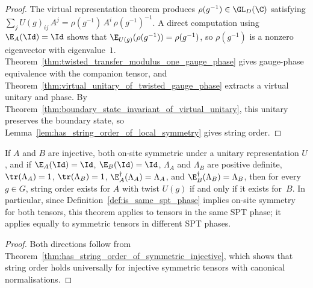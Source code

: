 \begin{proof}\leanok
    The virtual representation theorem produces
    $\rho(g^{-1}) \in \GL_{D}(\C)$ satisfying
    $\sum_j U(g)_{ij}\,A^j = \rho(g^{-1})\,A^i\,\rho(g^{-1})^{-1}$.
    A direct computation using $\E_A(\Id)=\Id$ shows that
    $\E_{U(g)}(\rho(g^{-1})) = \rho(g^{-1})$, so
    $\rho(g^{-1})$ is a nonzero eigenvector with eigenvalue~$1$.
    Theorem~\ref{thm:twisted_transfer_modulus_one_gauge_phase} gives
    gauge-phase equivalence with the companion tensor, and
    Theorem~\ref{thm:virtual_unitary_of_twisted_gauge_phase} extracts a virtual
    unitary and phase.
    By Theorem~\ref{thm:boundary_state_invariant_of_virtual_unitary}, this
    unitary preserves the boundary state, so
    Lemma~\ref{lem:has_string_order_of_local_symmetry} gives string order.
\end{proof}

\begin{theorem}%
    \label{thm:has_string_order_iff_of_symmetric_injective}
    \leanok
    If $A$ and $B$ are injective, both on-site symmetric under a
    unitary representation $U$, and if $\E_A(\Id)=\Id$,
    $\E_B(\Id)=\Id$, $\Lambda_A$ and $\Lambda_B$ are positive
    definite, $\tr(\Lambda_A)=1$, $\tr(\Lambda_B)=1$,
    $\E_A^\dagger(\Lambda_A)=\Lambda_A$, and
    $\E_B^\dagger(\Lambda_B)=\Lambda_B$, then for every $g \in G$,
    string order exists for $A$ with twist $U(g)$ if and only if it
    exists for~$B$. In particular, since
    Definition~\ref{def:is_same_spt_phase} implies on-site symmetry
    for both tensors, this theorem applies to tensors in the same SPT
    phase; it applies equally to symmetric tensors in different SPT
    phases.
\end{theorem}

\begin{proof}\leanok
    Both directions follow from
    Theorem~\ref{thm:has_string_order_of_symmetric_injective}, which
    shows that string order holds universally for injective symmetric
    tensors with canonical normalisations.
\end{proof}

